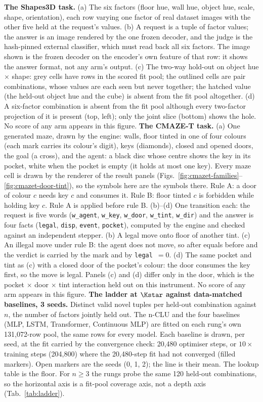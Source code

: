 \textbf{The Shapes3D task.} (a) The six factors (floor hue, wall hue, object hue, scale, shape, orientation), each row varying one factor of real dataset images with the other five held at the request's values. (b) A request is a tuple of factor values; the answer is an image rendered by the one frozen decoder, and the judge is the hash-pinned external classifier, which must read back all six factors. The image shown is the frozen decoder on the encoder's own feature of that row: it shows the answer format, not any arm's output. (c) The two-way hold-out on object hue $\times$ shape: grey cells have rows in the scored fit pool; the outlined cells are pair combinations, whose values are each seen but never together; the hatched value (the held-out object hue and the cube) is absent from the fit pool altogether. (d) A six-factor combination is absent from the fit pool although every two-factor projection of it is present (top, left); only the joint slice (bottom) shows the hole. No score of any arm appears in this figure.
\textbf{The CMAZE-T task.} (a) One generated maze, drawn by the engine: walls, floor tinted in one of four colours (each mark carries its colour's digit), keys (diamonds), closed and opened doors, the goal (a cross), and the agent: a black disc whose centre shows the key in its pocket, white when the pocket is empty (it holds at most one key). Every maze cell is drawn by the renderer of the result panels (Figs.~\ref{fig:cmazet-families}--\ref{fig:cmazet-door-tint}), so the symbols here are the symbols there. Rule A: a door of colour $c$ needs key $c$ and consumes it. Rule B: floor tinted $c$ is forbidden while holding key $c$. Rule A is applied before rule B. (b)--(d) One transition each: the request is five words (\texttt{w\_agent}, \texttt{w\_key}, \texttt{w\_door}, \texttt{w\_tint}, \texttt{w\_dir}) and the answer is four facts (\texttt{legal}, \texttt{disp}, \texttt{event}, \texttt{pocket}), computed by the engine and checked against an independent stepper. (b) A legal move onto floor of another tint. (c) An illegal move under rule B: the agent does not move, so after equals before and the verdict is carried by the mark and by \texttt{legal}~$=0$. (d) The same pocket and tint as (c) with a closed door of the pocket's colour: the door consumes the key first, so the move is legal. Panels (c) and (d) differ only in the door, which is the pocket $\times$ door $\times$ tint interaction held out on this instrument. No score of any arm appears in this figure.
\textbf{The ladder at $\Kstar$ against data-matched baselines, 3 seeds.} Distinct valid novel tuples per held-out combination against $n$, the number of factors jointly held out. The n-CLU and the four baselines (MLP, LSTM, Transformer, Continuous MLP) are fitted on each rung's own 131,072-row pool, the same rows for every model. Each baseline is drawn, per seed, at the fit carried by the convergence check: 20,480 optimiser steps, or $10\times$ training steps (204,800) where the 20,480-step fit had not converged (filled markers). Open markers are the seeds (0, 1, 2); the line is their mean. The lookup table is the floor. For $n\ge3$ the rungs probe the same 120 held-out combinations, so the horizontal axis is a fit-pool coverage axis, not a depth axis (Tab.~\ref{tab:ladder}).
